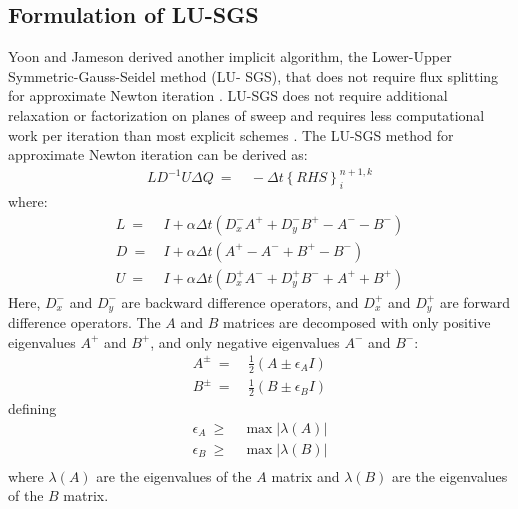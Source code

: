 \documentclass[conf]{new-aiaa}
\begin{document}
\subsection{Formulation of LU-SGS}
Yoon and Jameson derived another implicit algorithm, the Lower-Upper Symmetric-Gauss-Seidel method (LU- SGS), that does not require flux splitting for approximate Newton iteration \cite{LUSGS}. 
LU-SGS does not require additional relaxation or factorization on planes of sweep and requires less computational work per iteration than most explicit schemes \cite{YoonLUSGS}. The LU-SGS method for approximate Newton iteration can be derived as:
\begin{equation}
	\begin{split}
	\label{eq:LSGSUFinal}
		LD^{-1}U\Delta{Q}~=&~-\Delta{t}\left\{RHS\right\}^{n+1, k}_i
	\end{split}
\end{equation}
where:
\begin{equation}
	\begin{split}
            L~=&~I + \alpha\Delta{t}\left(D_x^-A^++D_y^-B^+-A^--B^-\right)\\
		D~=&~I + \alpha\Delta{t}\left(A^+-A^-+B^+-B^-\right) \\
		U~=&~I + \alpha\Delta{t}\left(D_x^+A^-+D_y^+B^-+A^++B^+\right)
	\end{split}
\end{equation}
Here, $D_x^-$ and $D_y^-$ are backward difference operators, and $D_x^+$ and $D_y^+$ are forward difference operators. The $A$ and $B$ matrices are decomposed with only positive eigenvalues $A^+$ and $B^+$, and only negative eigenvalues $A^-$ and $B^-$:
\begin{equation}
	\begin{split}
		\label{eq:A_B}
  			A^{\pm}~=&~\frac{1}{2}\left(A\pm\epsilon_{A}{I}\right) \\
  			B^{\pm}~=&~\frac{1}{2}\left(B\pm\epsilon_{B}{I}\right)
	\end{split}
\end{equation}
defining
\begin{equation}
	\begin{split}
		\label{eq:epsi_A_B}
  			\epsilon_A~\geq&~\max\left|\lambda(A)\right| \\
  			\epsilon_B~\geq&~\max\left|\lambda(B)\right| \\
	\end{split}
\end{equation}
where $\lambda(A)$ are the eigenvalues of the $A$ matrix and $\lambda(B)$ are the eigenvalues of the $B$ matrix.
\end{document}
